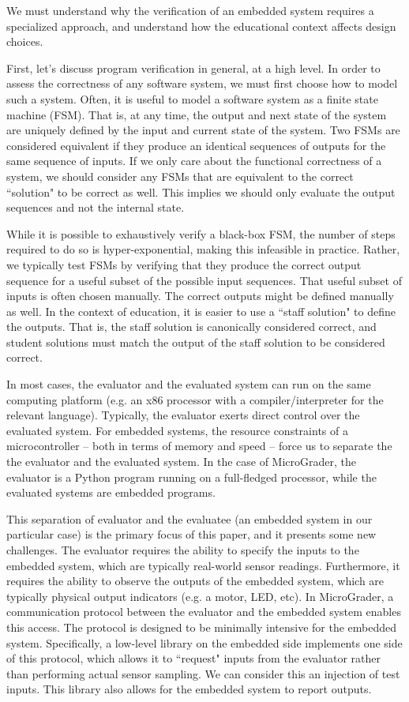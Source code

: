 \documentclass[12pt]{article}
\begin{document}
We must understand why the verification of an embedded system requires a specialized approach, and understand how the educational context affects design choices.

First, let's discuss program verification in general, at a high level. In order to assess the correctness of any software system, we must first choose how to model such a system.  Often, it is useful to model a software system as a finite state machine (FSM).  That is, at any time, the output and next state of the system are uniquely defined by the input and current state of the system.  Two FSMs are considered equivalent if they produce an identical sequences of outputs for the same sequence of inputs.  If we only care about the functional correctness of a system, we should consider any FSMs that are equivalent to the correct ``solution" to be correct as well.  This implies we should only evaluate the output sequences and not the internal state.

While it is possible to exhaustively verify a black-box FSM, the number of steps required to do so is hyper-exponential, making this infeasible in practice.  Rather, we typically test FSMs by verifying that they produce the correct output sequence for a useful subset of the possible input sequences.  That useful subset of inputs is often chosen manually.  The correct outputs might be defined manually as well.  In the context of education, it is easier to use a ``staff solution" to define the outputs.  That is, the staff solution is canonically considered correct, and student solutions must match the output of the staff solution to be considered correct.
   
In most cases, the evaluator and the evaluated system can run on the same computing platform (e.g. an x86 processor with a compiler/interpreter for the relevant language).  Typically, the evaluator exerts direct control over the evaluated system.  For embedded systems, the resource constraints of a microcontroller -- both in terms of memory and speed -- force us to separate the the evaluator and the evaluated system.  In the case of MicroGrader, the evaluator is a Python program running on a full-fledged processor, while the evaluated systems are embedded programs.

This separation of evaluator and the evaluatee (an embedded system in our particular case) is the primary focus of this paper, and it presents some new challenges.  The evaluator requires the ability to specify the inputs to the embedded system, which are typically real-world sensor readings.  Furthermore, it requires the ability to observe the outputs of the embedded system, which are typically physical output indicators (e.g. a motor, LED, etc).  In MicroGrader, a communication protocol between the evaluator and the embedded system enables this access.  The protocol is designed to be minimally intensive for the embedded system.  Specifically, a low-level library on the embedded side implements one side of this protocol, which allows it to ``request" inputs from the evaluator rather than performing actual sensor sampling.  We can consider this an injection of test inputs.  This library also allows for the embedded system to report outputs.
\end{document}
